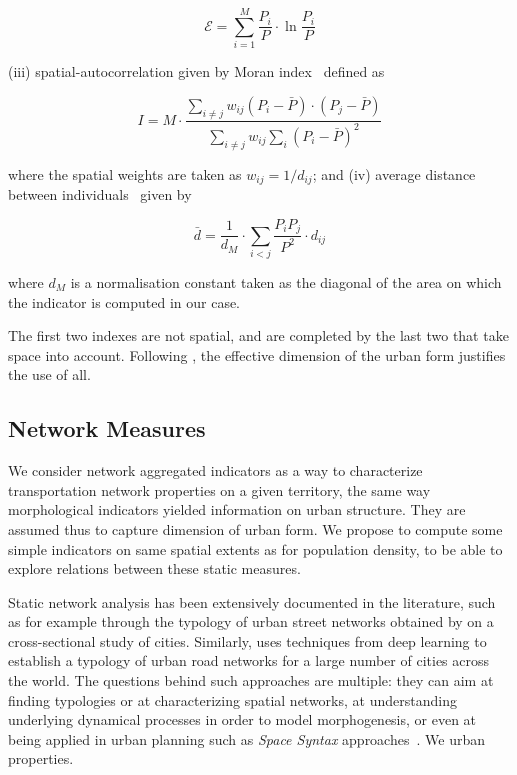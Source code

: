\begin{equation}
\mathcal{E} = \sum_{i=1}^{M}\frac{P_i}{P}\cdot \ln{\frac{P_i}{P}}
\end{equation}
 
(iii) spatial-autocorrelation given by Moran index~\citep{tsai2005quantifying} defined as

\begin{equation}
I = M \cdot \frac{\sum_{i\neq j} w_{ij} \left(P_i - \bar{P}\right)\cdot\left(P_j - \bar{P}\right)}{\sum_{i\neq j} w_{ij} \sum_{i}{\left( P_i - \bar{P}\right)}^2}
\end{equation}

where the spatial weights are taken as $w_{ij} = 1/d_{ij}$; and (iv) average distance between individuals~\citep{le2009quantifier} given by

\begin{equation}
\bar{d} = \frac{1}{d_M}\cdot \sum_{i<j} \frac{P_i P_j}{P^2} \cdot d_{ij}
\end{equation}

where $d_M$ is a normalisation constant taken as the diagonal of the area on which the indicator is computed in our case.

The first two indexes are not spatial, and are completed by the last two that take space into account. Following \cite{Schwarz201029}, the effective dimension of the urban form justifies the use of all.


\subsection{Network Measures}


We consider network aggregated indicators as a way to characterize transportation network properties on a given territory, the same way morphological indicators yielded information on urban structure. They are assumed thus to capture  dimension of urban form. We propose to compute some simple indicators on same spatial extents as for population density, to be able to explore relations between these static measures.

Static network analysis has been extensively documented in the literature, such as for example through the typology of urban street networks obtained by \cite{louf2014typology} on a cross-sectional study of cities. Similarly, \cite{2017arXiv170902939M} uses techniques from deep learning to establish a typology of urban road networks for a large number of cities across the world. The questions behind such approaches are multiple: they can aim at finding typologies or at characterizing spatial networks, at understanding underlying dynamical processes in order to model morphogenesis, or even at being applied in urban planning such as \emph{Space Syntax} approaches~\citep{hillier1989social}. We  urban  properties.

